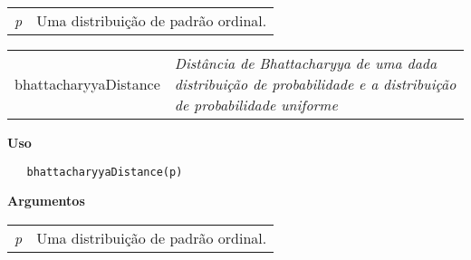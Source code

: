 \documentclass[12pt,letterpaper]{article}
\begin{document}
\begin{table}[!h]
\begin{center}
\begin{tabularx}{\textwidth}{X X}
\hspace{0.5cm} \textit{p} & Uma distribuição de padrão ordinal.\\
\end{tabularx}
\end{center}
\end{table} 

\newpage


\hrulefill   

\begin{table}[!h]
\begin{center}
\begin{tabularx}{\textwidth}{ X X}
\hspace{0.5cm} bhattacharyyaDistance & \textit{Distância de Bhattacharyya de uma dada distribuição de probabilidade e a distribuição de probabilidade uniforme}\\
\end{tabularx}
\end{center}
\end{table} 

\vspace{-0.5cm}

\hrulefill  

\vspace{0.5cm}

\textbf{Uso}

\begin{lstlisting}
   bhattacharyyaDistance(p)
\end{lstlisting}

\vspace{0.5cm}

\textbf{Argumentos}

\begin{table}[!h]
\begin{center}
\begin{tabularx}{\textwidth}{X X}
\hspace{0.5cm} \textit{p} & Uma distribuição de padrão ordinal.\\
\end{tabularx}
\end{center}
\end{table} 
\end{document}
